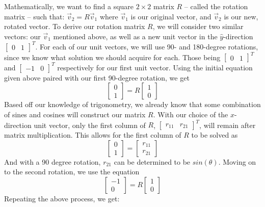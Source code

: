 \documentclass[12pt]{report}
\begin{document}
Mathematically, we want to find a square $2\times2$ matrix $R$ – called the rotation matrix – such that: $\vec{v}_2=R\vec{v}_1$
where $\vec{v}_1$ is our original vector, and $\vec{v}_2$ is our new, rotated vector. To derive our rotation matrix $R$, we will consider two similar vectors: our $\vec{v}_1$ mentioned above, as well as a new unit vector in the $\hat{y}$-direction 
$\begin{bmatrix}
    0&1
\end{bmatrix}^T$.
For each of our unit vectors, we will use 90- and 180-degree rotations, since we know what solution we should acquire for each. Those being 
$\begin{bmatrix}
    0&1
\end{bmatrix}^T$
and 
$\begin{bmatrix}
    -1&0
\end{bmatrix}^T$
respectively for our first unit vector. 
Using the initial equation given above paired with our first 90-degree rotation, we get
$$\begin{bmatrix}
    0\\1
\end{bmatrix}=R
\begin{bmatrix}
    1\\0
\end{bmatrix}$$
Based off our knowledge of trigonometry, we already know that some combination of sines and cosines will construct our matrix $R$. With our choice of the $\hat{x}$-direction unit vector, only the first column of $R$, $\begin{bmatrix}
    r_{11}&r_{21}
\end{bmatrix}^T$, will remain after matrix multiplication. This allows for the first column of $R$ to be solved as
$$\begin{bmatrix}
    0\\1
\end{bmatrix}=
\begin{bmatrix}
    r_{11}\\r_{21}
\end{bmatrix}
$$
And with a 90 degree rotation, $r_{21}$ can be determined to be $sin(\theta)$. Moving on to the second rotation, we use the equation 
$$\begin{bmatrix}
    -1\\0
\end{bmatrix}=R
\begin{bmatrix}
    1\\0
\end{bmatrix}$$
Repeating the above process, we get:
\end{document}
